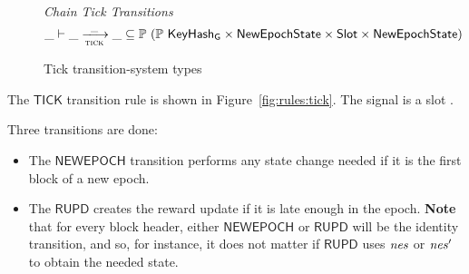 \begin{figure}
  \emph{Chain Tick Transitions}
  \begin{equation*}
    \_ \vdash \var{\_} \trans{tick}{\_} \var{\_} \subseteq
    \powerset (\powerset{\KeyHashGen} \times \NewEpochState \times \Slot \times \NewEpochState)
  \end{equation*}
  \caption{Tick transition-system types}
  \label{fig:ts-types:tick}
\end{figure}

The $\mathsf{TICK}$ transition rule is shown in Figure~\ref{fig:rules:tick}.
The signal is a slot .

Three transitions are done:

\begin{itemize}
  \item The $\mathsf{NEWEPOCH}$ transition performs any state change needed if it is the first
    block of a new epoch.
  \item The $\mathsf{RUPD}$ creates the reward update if it is late enough in the epoch.
    \textbf{Note} that for every block header, either $\mathsf{NEWEPOCH}$ or $\mathsf{RUPD}$
    will be the identity transition, and so, for instance, it does not matter if $\mathsf{RUPD}$
    uses $\mathit{nes}$ or $\mathit{nes}'$ to obtain the needed state.
\end{itemize}


